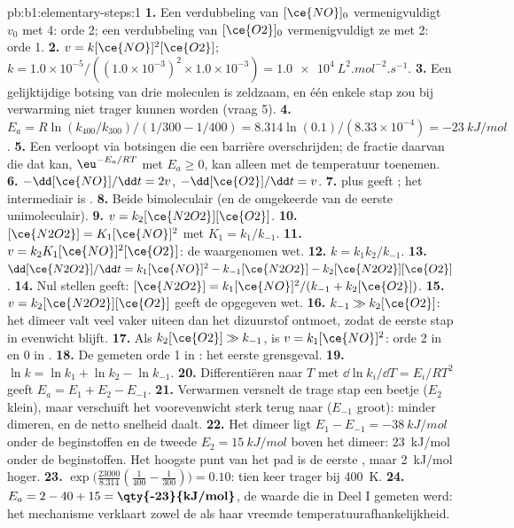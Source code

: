 \begin{solution}{pb:b1:elementary-steps:1}
\textbf{1.} Een verdubbeling van $[\ce{NO}]_0$ vermenigvuldigt $v_0$ met
4: orde 2; een verdubbeling van
$[\ce{O2}]_0$ vermenigvuldigt ze met 2: orde 1.
\textbf{2.} $v = k[\ce{NO}]^2[\ce{O2}]$; $k = 1.0 \times 10^{-5}/((1.0
\times 10^{-3})^2 \times 1.0 \times 10^{-3}) =
\qty{1.0e4}{L^2.mol^{-2}.s^{-1}}$.
\textbf{3.} Een gelijktijdige botsing van drie moleculen is zeldzaam, en
één enkele stap zou bij verwarming niet trager kunnen worden (vraag 5).
\textbf{4.} $E_a = R\ln(k_{400}/k_{300})/(1/300 - 1/400) = 8.314 \ln(0.1)
/(8.33 \times 10^{-4}) = \qty{-23}{kJ/mol}$.
\textbf{5.} Een  verloopt via botsingen die een barrière
overschrijden; de fractie daarvan die dat kan, $\eu^{-E_a/RT}$ met $E_a \ge
0$, kan alleen met de temperatuur toenemen.
\textbf{6.} $-\dd[\ce{NO}]/\dd t = 2v$, $-\dd[\ce{O2}]/\dd t = v$.
\textbf{7.}  plus  geeft
; het intermediair is .
\textbf{8.} Beide bimoleculair (en de omgekeerde van de eerste
unimoleculair).
\textbf{9.} $v = k_2[\ce{N2O2}][\ce{O2}]$.
\textbf{10.} $[\ce{N2O2}] = K_1[\ce{NO}]^2$ met $K_1 = k_1/k_{-1}$.
\textbf{11.} $v = k_2K_1[\ce{NO}]^2[\ce{O2}]$: de waargenomen wet.
\textbf{12.} $k = k_1k_2/k_{-1}$.
\textbf{13.} $\dd[\ce{N2O2}]/\dd t = k_1[\ce{NO}]^2 - k_{-1}[\ce{N2O2}] -
k_2[\ce{N2O2}][\ce{O2}]$.
\textbf{14.} Nul stellen geeft: $[\ce{N2O2}] = k_1[\ce{NO}]^2/(k_{-1} +
k_2[\ce{O2}])$.
\textbf{15.} $v = k_2[\ce{N2O2}][\ce{O2}]$ geeft de opgegeven wet.
\textbf{16.} $k_{-1} \gg k_2[\ce{O2}]$: het dimeer valt veel vaker uiteen
dan het dizuurstof ontmoet, zodat de eerste stap in evenwicht blijft.
\textbf{17.} Als $k_2[\ce{O2}] \gg k_{-1}$, is $v = k_1[\ce{NO}]^2$: orde
2 in  en 0 in .
\textbf{18.} De gemeten orde 1 in : het eerste grensgeval.
\textbf{19.} $\ln k = \ln k_1 + \ln k_2 - \ln k_{-1}$.
\textbf{20.} Differentiëren naar $T$ met $\dd\ln k_i/\dd T
= E_i/RT^2$ geeft $E_a = E_1 + E_2 - E_{-1}$.
\textbf{21.} Verwarmen versnelt de trage stap een beetje ($E_2$ klein),
maar verschuift het voorevenwicht sterk terug naar  ($E_{-1}$
groot): minder dimeren, en de netto snelheid daalt.
\textbf{22.} Het dimeer ligt $E_1 - E_{-1} = \qty{-38}{kJ/mol}$ onder de
beginstoffen en de tweede  $E_2 = \qty{15}{kJ/mol}$
boven het dimeer: \qty{23}{kJ/mol} onder de beginstoffen. Het hoogste
punt van het pad is de eerste , maar \qty{2}{kJ/mol}
hoger.
\textbf{23.} $\exp\big(\frac{23000}{8.314}(\frac{1}{400} - \frac{1}{300})\big)
= 0.10$: tien keer trager bij \qty{400}{K}.
\textbf{24.} $E_a = 2 - 40 + 15 = \textbf{\qty{-23}{kJ/mol}}$, de waarde
die in Deel I gemeten werd: het mechanisme verklaart zowel de
 als haar vreemde temperatuurafhankelijkheid.
\end{solution}
